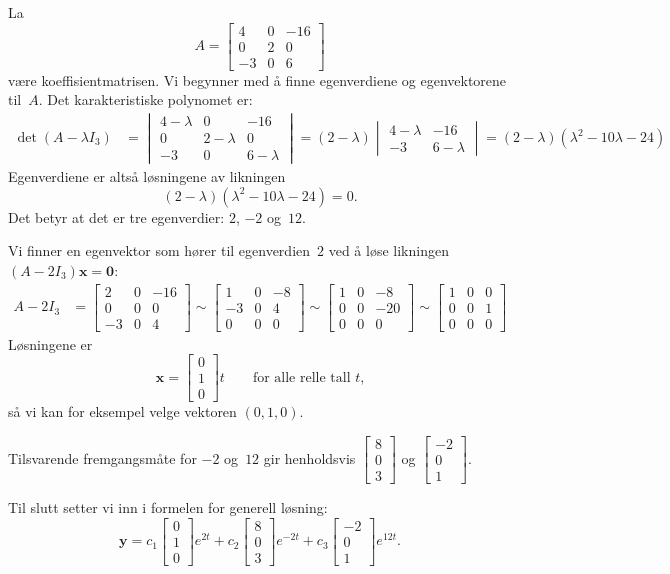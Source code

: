 \documentclass[notitlepage,a4paper,12pt,norsk]{IMFeksamen}
\newcommand{\roweq}{\sim}
\newcommand{\V}[1]{\mathbf{#1}}
\newcommand{\vvv}[3]{\begin{bmatrix} #1 \\ #2 \\ #3 \end{bmatrix}}
\newcommand{\x}{\V{x}}
\newcommand{\0}{\V{0}}
\newcommand{\oppgslutt}{
\begin{center}
\pgfornament[width=6cm]{88}
\end{center}
}
\newenvironment{losning}{\begin{oppgave}}{\oppgslutt\end{oppgave}}
\begin{document}
\begin{losning}
La
\[
A=
\begin{bmatrix}
4 & 0 & -16 \\
0 & 2 & 0 \\
-3 & 0 & 6
\end{bmatrix}
\]
være koeffisientmatrisen.  Vi begynner med å finne egenverdiene og
egenvektorene til~$A$.  Det karakteristiske polynomet er:
\begin{align*}
\det (A - \lambda I_3)
&=
\begin{vmatrix}
4-\lambda & 0 & -16 \\
0 & 2-\lambda & 0 \\
-3 & 0 & 6-\lambda
\end{vmatrix}
=
(2-\lambda)
\begin{vmatrix}
4-\lambda & -16 \\
-3 &  6-\lambda
\end{vmatrix}
= (2 - \lambda) (\lambda^2 - 10\lambda - 24)
\end{align*}
Egenverdiene er altså løsningene av likningen
\[
(2 - \lambda) (\lambda^2 - 10\lambda - 24) = 0.
\]
Det betyr at det er tre egenverdier: $2$, $-2$ og~$12$.

Vi finner en egenvektor som hører til egenverdien~$2$
ved å løse likningen $(A - 2 I_3) \x = \0$:
\begin{align*}
A - 2 I_3 &=
\begin{bmatrix}
2 & 0 & -16 \\
0 & 0 & 0 \\
-3 & 0 & 4
\end{bmatrix}
\roweq
\begin{bmatrix}
1 & 0 & -8 \\
-3 & 0 & 4 \\
0 & 0 & 0
\end{bmatrix}
\roweq
\begin{bmatrix}
1 & 0 & -8 \\
0 & 0 & -20 \\
0 & 0 & 0
\end{bmatrix}
\roweq
\begin{bmatrix}
1 & 0 & 0 \\
0 & 0 & 1 \\
0 & 0 & 0
\end{bmatrix}
\end{align*}
Løsningene er
\[
\x = \vvv{0}{1}{0} t
\qquad\text{for alle relle tall~$t$,}
\]
så vi kan for eksempel velge vektoren $(0,1,0)$.

Tilsvarende fremgangsmåte for $-2$ og~$12$ gir henholdsvis
$\vvv{8}{0}{3}$ og $\vvv{-2}{0}{1}$.

Til slutt setter vi inn i formelen for generell løsning:
$$\V{y} = c_1\vvv{0}{1}{0}e^{2t}+c_2\vvv{8}{0}{3}e^{-2t}+c_3 \vvv{-2}{0}{1}e^{12t}.$$
\end{losning}
\end{document}
